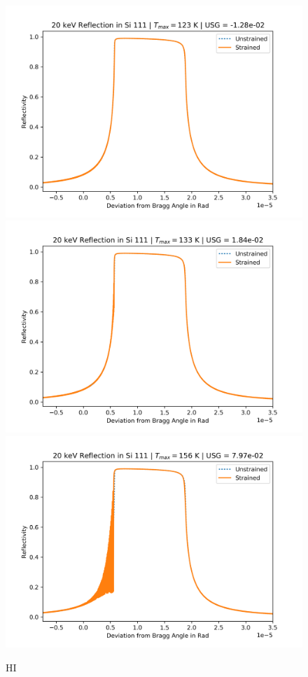 \documentclass[preprint]{iucr}              %
\begin{document}
\begin{figure}
\caption{HI}
\includegraphics{images/111_20keV_4.png}
\includegraphics{images/111_20keV_5.png}
\includegraphics{images/111_20keV_7.png}

\end{figure}
\end{document}
